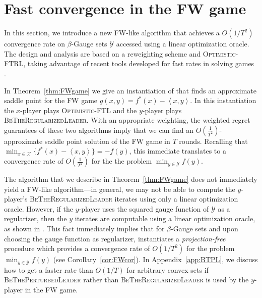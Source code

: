 \documentclass[pmlr]{jmlr} %
\def\BTRL{\textsc{BeTheRegularizedLeader}\xspace}
\def\BTPL{\textsc{BeThePerturbedLeader}\xspace}
\def\OFTRL{\textsc{Optimistic-FTRL}\xspace}
\def\OFTL{\textsc{Optimistic-FTL}\xspace}
\newcommand{\lr}[2]{\left\langle#1,#2\right\rangle}
\newcommand{\XX}{\mathcal{X}}
\newcommand{\YY}{\mathcal{Y}}
\begin{document}


\section{Fast convergence in the FW game}\label{sec:fastfw}
In this section, we introduce a new FW-like algorithm that achieves a $O(1/T^{2})$ convergence rate on $\beta$-Gauge  sets $\YY$ accessed using a linear optimization oracle. The design and analysis are based on a reweighting scheme and \OFTRL, taking advantage of recent tools developed for fast rates in solving games \citep{CJ12,RS13,SALS15}.

In Theorem~\ref{thm:FWgame} we give an instantiation of  that finds an approximate saddle point for the FW game $g(x,y) = f^{*}(x) - \lr{x}{y}$. In this  instantiation  the $x$-player plays 
\OFTL and the $y$-player plays \BTRL. With an appropriate weighting, the weighted regret guarantees of these two algorithms imply that we can find an $O(\frac{1}{T^{2}})$-approximate saddle point solution of the FW game in $T$ rounds.
Recalling that $\min_{x\in\XX}\{ f^{*}(x) - \lr{x}{y}\} = -f(y)$,  this 
  immediate translates to a convergence rate of  $O(\frac{1}{T^{2}})$ for the the problem $\min_{y\in\YY}f(y)$.





The algorithm that we describe in 
Theorem~\ref{thm:FWgame} does not immediately yield a FW-like algorithm---in general, we may not be able to compute the $y$-player's \BTRL iterates using only a linear optimization oracle. However, if the $y$-player uses the squared gauge function of $\YY$ as a regularizer, then the $y$ iterates are computable using a linear optimization oracle, as shown in . This fact immediately implies that for $\beta$-Gauge sets
and upon choosing the gauge function as regularizer,  instantiates a \emph{projection-free} procedure which provides a convergence rate of $O(1/T^{2})$ for the problem  $\min_{y\in\YY}f(y)$ (see Corollary~\ref{cor:FWcor}).
In Appendix~\ref{app:BTPL}, we discuss how to get a faster rate than $O(1/T)$ for arbitrary convex sets if \BTPL rather than \BTRL is used by the $y$-player in the FW game.
\end{document}
